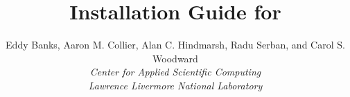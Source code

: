 \documentclass[twoside,openright,10pt]{report}
\title{Installation Guide for {\sundials} {\sunrelease}}
\author{
  Eddy Banks, Aaron M. Collier, Alan C. Hindmarsh, Radu Serban, and Carol S. Woodward\\
  {\em Center for Applied Scientific Computing} \\
  {\em Lawrence Livermore National Laboratory}
}
\date{
  \today 
  \vfill {\centerline{\psfig{figure=doc_logo.eps,width=0.5\textwidth}}}
  \vfill \kinucrlug
}
\begin{document}
\frontex


\clearemptydoublepage
\end{document}
